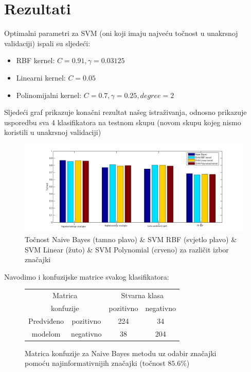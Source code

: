 \documentclass[conference]{IEEEtran}
\begin{document}
\section{Rezultati}

Optimalni parametri za SVM (oni koji imaju najveću točnost u unakrsnoj
validaciji) ispali su sljedeći:

\begin{itemize}
  \item RBF kernel: $C=0.91, \gamma =0.03125$
  \item Linearni kernel: $C=0.05$
  \item Polinomijalni kernel: $C=0.7, \gamma =0.25, degree=2$
\end{itemize}

Sljedeći graf prikazuje konačni rezultat našeg istraživanja, odnosno prikazuje
usporedbu sva 4 klasifikatora na testnom skupu (novom skupu kojeg nismo
koristili u unakrsnoj validaciji)

\begin{figure}[H]
\begin{minipage}{0.5\textwidth}
\centering
\includegraphics[width=\textwidth]{images/SVM_tocnost.png}
\caption{Točnost Naive Bayes (tamno plavo) \& SVM RBF (svjetlo plavo) \& SVM Linear (žuto) \& SVM Polynomial (crveno) za različit izbor značajki}
\end{minipage}
\end{figure}

Navodimo i konfuzijske matrice svakog klasifikatora:

\begin{figure}[H]
\begin{minipage}{0.5\textwidth}
\centering
\begin{tabular}{|c|c|c|c|}
  \hline
  \multicolumn{2}{|c|}{Matrica}  & \multicolumn{2}{|c|}{Stvarna klasa} \\ 
  \cline{3-4}
  \multicolumn{2}{|c|}{konfuzije} & pozitivno & negativno \\ 
  \hline
  Predviđeno & pozitivno & 224 & 34 \\
  \cline{2-4}
  modelom & negativno & 38 & 204 \\
  \hline
\end{tabular}
\caption{Matrica konfuzije za Naive Bayes metodu uz odabir značajki pomoću najinformativnijih značajki (točnost $85.6\%$)}
\end{minipage}
\end{figure}
\end{document}

